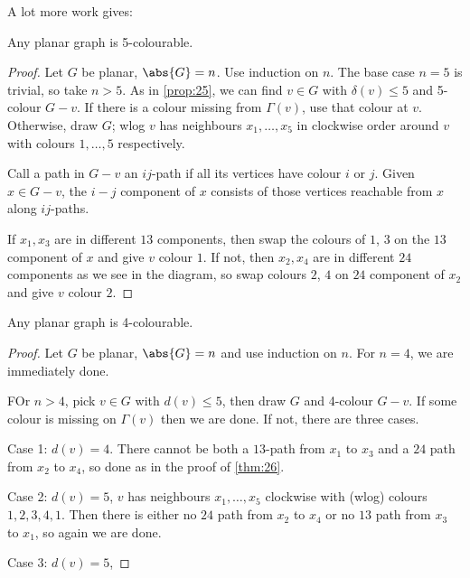 \documentclass{article}
\begin{document}
A lot more work gives:
\begin{nthm}\label{thm:26}
    Any planar graph is 5-colourable.
\end{nthm}
\begin{proof}
    Let $G$ be planar, $\abs{G} = n$. Use induction on $n$. The base case $n=5$ is trivial, so take $n > 5$.
    As in \cref{prop:25}, we can find $v \in G$ with $\delta(v) \leq 5$ and 5-colour $G-v$.
    If there is a colour missing from $\Gamma(v)$, use that colour at $v$.
    Otherwise, draw $G$; wlog $v$ has neighbours $x_1, \dotsc, x_5$ in clockwise order around $v$ with colours $1, \dotsc, 5$ respectively.

    Call a path in $G-v$ an $ij$-path if all its vertices have colour $i$ or $j$.
    Given $x \in G-v$, the $i-j$ component of $x$ consists of those vertices reachable from $x$ along $ij$-paths.

    If $x_1, x_3$ are in different $13$ components, then swap the colours of $1$, $3$ on the $13$ component of $x$ and give $v$ colour $1$.
    If not, then $x_2, x_4$ are in different $24$ components as we see in the diagram, so swap colours $2$, $4$ on $24$ component of $x_2$ and give $v$ colour $2$.
\end{proof}

\begin{thm}\label{thm:27}
    Any planar graph is 4-colourable.
\end{thm}

\begin{proof}
    Let $G$ be planar, $\abs{G} = n$ and use induction on $n$. For $n=4$, we are immediately done.

    FOr $n > 4$, pick $v \in G$ with $d(v) \leq 5$, then draw $G$ and 4-colour $G-v$.
    If some colour is missing on $\Gamma(v)$ then we are done.
    If not, there are three cases.

    Case 1: $d(v) = 4$. There cannot be both a $13$-path from $x_1$ to $x_3$ and a $24$ path from $x_2$ to $x_4$, so done as in the proof of \cref{thm:26}.

    Case 2: $d(v) = 5$, $v$ has neighbours $x_1, \dotsc, x_5$ clockwise with (wlog) colours $1,2,3,4,1$.
    Then there is either no $24$ path from $x_2$ to $x_4$ or no $13$ path from $x_3$ to $x_1$, so again we are done.

    Case 3: $d(v) = 5$, %
\end{proof}
\end{document}
